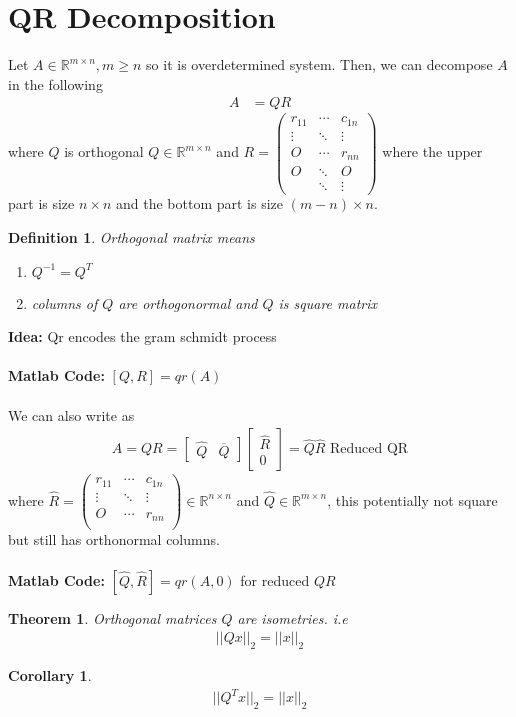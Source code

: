 \documentclass[11pt,oneside]{book}
\theoremstyle{break}
\theoremstyle{break}
\newtheorem{thm}{Theorem}[section]
\newtheorem{corT}[lem]{Corollary}
\newtheorem{defn}{Definition}[corL]
\newcommand{\R}{\mathbb{R}}
\begin{document}
\section[QR Decomposition]{QR Decomposition}
Let $A\in \R^{m\times n},m\geq n$ so it is overdetermined system. Then, we can decompose $A$ in the following \begin{align*}
A&=QR
\end{align*}
where $Q$ is orthogonal $Q\in \R^{m\times n}$ and $R=\begin{pmatrix}
r_{11} &\cdots &c_{1n}\\
\vdots&\ddots&\vdots\\
O&\cdots&r_{nn}\\
\hline O&\ddots &O\\
&\ddots&\vdots
\end{pmatrix}$ 
where the upper part is size $n\times n$ and the bottom part is size $(m-n)\times n$.
\begin{defn}
Orthogonal matrix means \begin{enumerate}
\item $Q^{-1}=Q^T$
\item columns of $Q$ are orthogonormal  and $Q$ is square matrix
\end{enumerate}
\end{defn}
\textbf{Idea:} Qr encodes the gram schmidt  process\\
\hfill\\
\textbf{Matlab Code:} $[Q,R]=qr(A)$\\
\hfill\\
We can also write as \begin{align*}
A=QR=\begin{bmatrix}
\hat{Q}&\overline{Q}
\end{bmatrix}\begin{bmatrix}
\hat{R}\\
0
\end{bmatrix}=\hat{Q}\hat{R}\text{ Reduced QR}
\end{align*}
where $\hat{R}= \begin{pmatrix}
r_{11} &\cdots &c_{1n}\\
\vdots&\ddots&\vdots\\
O&\cdots&r_{nn}\\
\end{pmatrix}\in \R^{n\times n}$ and $\hat{Q}\in \R^{m\times n}$, this potentially not square but still has orthonormal columns.\\
\hfill\\
\textbf{Matlab Code:} $[\hat{Q},\hat{R}]=qr(A,0)$ for reduced $QR$
\begin{thm}
Orthogonal matrices $Q$ are isometries. i.e \begin{align*}
||Qx||_2=||x||_2
\end{align*}
\end{thm}
\begin{corT}
\begin{align*}
||Q^Tx||_2=||x||_2
\end{align*}
\end{corT}
\end{document}
